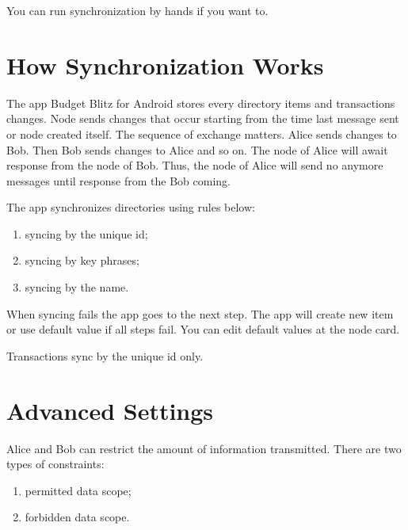 \documentclass[a4paper,10pt,english]{sphinxmanual}
\begin{document}
You can run synchronization by hands if you want to.


\section{How Synchronization Works}
\label{\detokenize{teamwork:how-synchronization-works}}
The app Budget Blitz for Android stores every directory items and transactions changes. Node sends changes
that occur starting from the time last message sent or node created itself. The sequence
of exchange matters. Alice sends changes to Bob. Then Bob sends changes to Alice and so on.
The node of Alice will await response from the node of Bob. Thus, the node of Alice will send
no anymore messages until response from the Bob coming.

The app synchronizes directories using rules below:
\begin{enumerate}
\def\theenumi{\arabic{enumi}}
\def\labelenumi{\theenumi .}
\makeatletter\def\p@enumii{\p@enumi \theenumi .}\makeatother
\item {} 
syncing by the unique id;

\item {} 
syncing by key phrases;

\item {} 
syncing by the name.

\end{enumerate}

When syncing fails the app goes to the next step. The app will create new item or use default value
if all steps fail. You can edit default values at the node card.

Transactions sync by the unique id only.


\section{Advanced Settings}
\label{\detokenize{teamwork:advanced-settings}}
Alice and Bob can restrict the amount of information transmitted. There are two types of constraints:
\begin{enumerate}
\def\theenumi{\arabic{enumi}}
\def\labelenumi{\theenumi .}
\makeatletter\def\p@enumii{\p@enumi \theenumi .}\makeatother
\item {} 
permitted data scope;

\item {} 
forbidden data scope.

\end{enumerate}
\end{document}

